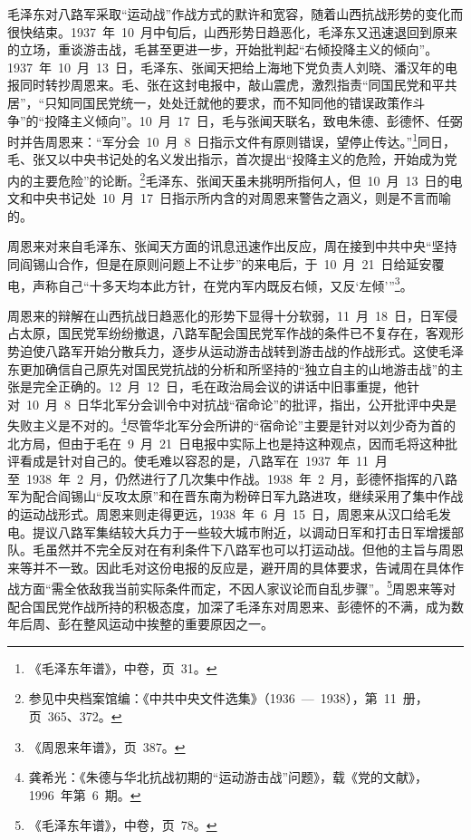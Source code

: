 毛泽东对八路军采取“运动战”作战方式的默许和宽容，随着山西抗战形势的变化而很快结束。1937~年~10~月中旬后，山西形势日趋恶化，毛泽东又迅速退回到原来的立场，重谈游击战，毛甚至更进一步，开始批判起“右倾投降主义的倾向”。1937~年~10~月~13~日，毛泽东、张闻天把给上海地下党负责人刘晓、潘汉年的电报同时转抄周恩来。毛、张在这封电报中，敲山震虎，激烈指责“同国民党和平共居”，“只知同国民党统一，处处迁就他的要求，而不知同他的错误政策作斗争”的“投降主义倾向”。10~月~17~日，毛与张闻天联名，致电朱德、彭德怀、任弼时并告周恩来：“军分会~10~月~8~日指示文件有原则错误，望停止传达。”\footnote{《毛泽东年谱》，中卷，页~31。}同日，毛、张又以中央书记处的名义发出指示，首次提出“投降主义的危险，开始成为党内的主要危险”的论断。\footnote{参见中央档案馆编：《中共中央文件选集》（1936~—~1938），第~11~册，页~365、372。}毛泽东、张闻天虽未挑明所指何人，但~10~月~13~日的电文和中央书记处~10~月~17~日指示所内含的对周恩来警告之涵义，则是不言而喻的。

周恩来对来自毛泽东、张闻天方面的讯息迅速作出反应，周在接到中共中央“坚持同阎锡山合作，但是在原则问题上不让步”的来电后，于~10~月~21~日给延安覆电，声称自己“十多天均本此方针，在党内军内既反右倾，又反‘左倾’”\footnote{《周恩来年谱》，页~387。}。

周恩来的辩解在山西抗战日趋恶化的形势下显得十分软弱，11~月~18~日，日军侵占太原，国民党军纷纷撤退，八路军配会国民党军作战的条件已不复存在，客观形势迫使八路军开始分散兵力，逐步从运动游击战转到游击战的作战形式。这使毛泽东更加确信自己原先对国民党抗战的分析和所坚持的“独立自主的山地游击战”的主张是完全正确的。12~月~12~日，毛在政治局会议的讲话中旧事重提，他针对~10~月~8~日华北军分会训令中对抗战“宿命论”的批评，指出，公开批评中央是失败主义是不对的。\footnote{龚希光：《朱德与华北抗战初期的“运动游击战”问题》，载《党的文献》，1996~年第~6~期。}尽管华北军分会所讲的“宿命论”主要是针对以刘少奇为首的北方局，但由于毛在~9~月~21~日电报中实际上也是持这种观点，因而毛将这种批评看成是针对自己的。使毛难以容忍的是，八路军在~1937~年~11~月至~1938~年~2~月，仍然进行了几次集中作战。1938~年~2~月，彭德怀指挥的八路军为配合阎锡山“反攻太原”和在晋东南为粉碎日军九路进攻，继续采用了集中作战的运动战形式。周恩来则走得更远，1938~年~6~月~15~日，周恩来从汉口给毛发电。提议八路军集结较大兵力于一些较大城市附近，以调动日军和打击日军增援部队。毛虽然并不完全反对在有利条件下八路军也可以打运动战。但他的主旨与周恩来等并不一致。因此毛对这份电报的反应是，避开周的具体要求，告诫周在具体作战方面“需全依敌我当前实际条件而定，不因人家议论而自乱步骤”。\footnote{《毛泽东年谱》，中卷，页~78。}周恩来等对配合国民党作战所持的积极态度，加深了毛泽东对周恩来、彭德怀的不满，成为数年后周、彭在整风运动中挨整的重要原因之一。

